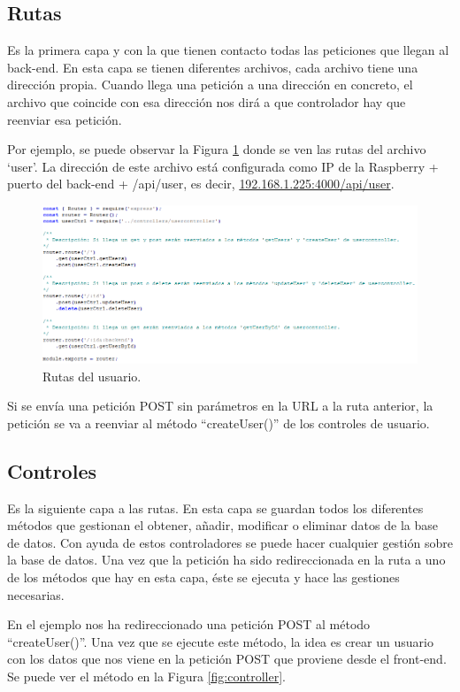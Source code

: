 \subsection{Rutas}
Es la primera capa y con la que tienen contacto todas las peticiones que llegan al back-end. En esta capa se tienen diferentes archivos, cada archivo tiene una dirección propia. Cuando llega una petición a una dirección en concreto, el archivo que coincide con esa dirección nos dirá a que controlador hay que reenviar esa petición.

Por ejemplo, se puede observar la Figura \ref{fig:routes} donde se ven las rutas del archivo ‘user’. La dirección de este archivo está configurada como IP de la Raspberry + puerto del back-end + /api/user, es decir, \url{192.168.1.225:4000/api/user}.

\begin{figure}[h] 
    \centering
    \includegraphics[width=.80\textwidth]{capitulos/capitulo8/routeuser.png}
    \caption{Rutas del usuario.}
    \label{fig:routes}
\end{figure}

Si se envía una petición POST sin parámetros en la URL a la ruta anterior, la petición se va a reenviar al método “createUser()” de los controles de usuario.

\subsection{Controles}
Es la siguiente capa a las rutas. En esta capa se guardan todos los diferentes métodos que gestionan el obtener, añadir, modificar o eliminar datos de la base de datos. Con ayuda de estos controladores se puede hacer cualquier gestión sobre la base de datos. Una vez que la petición ha sido redireccionada en la ruta a uno de los métodos que hay en esta capa, éste se ejecuta y hace las gestiones necesarias.

En el ejemplo nos ha redireccionado una petición POST al método “createUser()”. Una vez que se ejecute este método, la idea es crear un usuario con los datos que nos viene en la petición POST que proviene desde el front-end. Se puede ver el método en la Figura \ref{fig:controller}.

